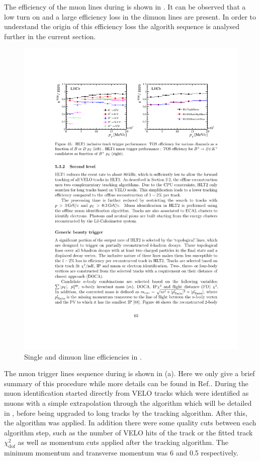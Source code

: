 The efficiency of the muon lines during \runone is shown in .
It can be observed that a low \pt turn on and a large efficiency loss in the dimuon lines are present.
In order to understand the origin of this efficiency loss
the \hltone algorith sequence is analysed further in the current section.


\begin{figure}[h!]
  \centering
  \includegraphics[trim=11cm 20.5cm 2cm 3cm, clip=true,scale=1.]{Figures/Chapter3/hlt1_muon_eff_run1.pdf}
  \caption{ Single and dimuon \hltone line efficiencies in \runone \cite{LHCb-PROC-2014-005}. }
  \label{fig:hlt1_eff_run1}
\end{figure}


The \hltone muon trigger lines sequence during \runone is shown in (a).
Here we only give a brief summary of this procedure while more details can be found in Ref.\cite{LHCb-PUB-2011-017}.
During \runone the muon identification started directly from VELO tracks
which were identified as muons with a simple extrapolation through the \mvm algorithm\cite{LHCb-PUB-2011-017}
which will be detailed in ,
before being upgraded to long tracks by the \FwD tracking algorithm.
After this, the  algorithm was applied.
In addition there were some quality cuts between each algorithm step, such as the number of VELO hits
of the track or the fitted track $\chi^2_{\text {dof}}$ as well as momentum cuts applied after the \FwD tracking algorithm.
The minimum momentum and transverse momentum was 6 \gevc and 0.5 \gevc respectively.

